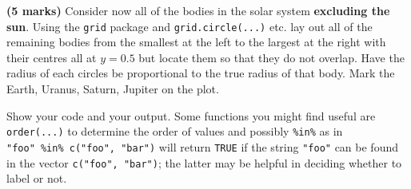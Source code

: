 \documentclass[9pt,letter]{article}
\begin{document}
\item 

\textbf{(5 marks)} Consider now all of the bodies in the solar system
\textbf{excluding the sun}. Using the \texttt{grid} package and
\texttt{grid.circle(...)} etc. lay out all of the remaining bodies from
the smallest at the left to the largest at the right with their centres
all at \(y=0.5\) but locate them so that they do not overlap. Have the
radius of each circles be proportional to the true radius of that body.
Mark the Earth, Uranus, Saturn, Jupiter on the plot.

Show your code and your output. Some functions you might find useful are
\texttt{order(...)} to determine the order of values and possibly
\texttt{\%in\%} as in \texttt{"foo"\ \%in\%\ c("foo",\ "bar")} will
return \texttt{TRUE} if the string \texttt{"foo"} can be found in the
vector \texttt{c("foo",\ "bar")}; the latter may be helpful in deciding
whether to label or not.
\end{document}
